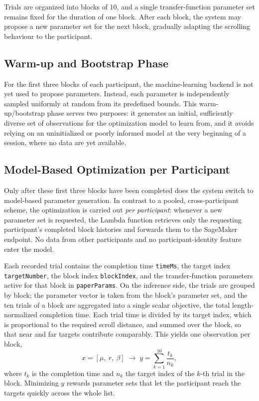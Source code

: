Trials are organized into blocks of 10, and a single transfer-function parameter set remains fixed for the duration of one block. After each block, the system may propose a new parameter set for the next block, gradually adapting the scrolling behaviour to the participant.

\subsection{Warm-up and Bootstrap Phase}

For the first three blocks of each participant, the machine-learning backend is not yet used to propose parameters. Instead, each parameter is independently sampled uniformly at random from its predefined bounds. This warm-up/bootstrap phase serves two purposes: it generates an initial, sufficiently diverse set of observations for the optimization model to learn from, and it avoids relying on an uninitialized or poorly informed model at the very beginning of a session, where no data are yet available.

\subsection{Model-Based Optimization per Participant}

Only after these first three blocks have been completed does the system switch to model-based parameter generation. In contrast to a pooled, cross-participant scheme, the optimization is carried out \emph{per participant}: whenever a new parameter set is requested, the Lambda function retrieves only the requesting participant's completed block histories and forwards them to the SageMaker endpoint. No data from other participants and no participant-identity feature enter the model.

Each recorded trial contains the completion time \texttt{timeMs}, the target index \texttt{targetNumber}, the block index \texttt{blockIndex}, and the transfer-function parameters active for that block in \texttt{paperParams}. On the inference side, the trials are grouped by block; the parameter vector is taken from the block's parameter set, and the ten trials of a block are aggregated into a single scalar objective, the total length-normalized completion time. Each trial time is divided by its target index, which is proportional to the required scroll distance, and summed over the block, so that near and far targets contribute comparably. This yields one observation per block,
\begin{equation}
    x = [\mu,\ r,\ \beta] \;\longrightarrow\; y = \sum_{k=1}^{10} \frac{t_k}{n_k},
    \label{eq:sd-scalar-objective}
\end{equation}
where $t_k$ is the completion time and $n_k$ the target index of the $k$-th trial in the block. Minimizing $y$ rewards parameter sets that let the participant reach the targets quickly across the whole list.

